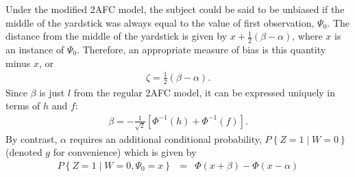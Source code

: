 \documentclass[man]{apa6}
\begin{document}
Under the modified 2AFC model, the subject could be said to be unbiased if the middle of the yardstick was always equal to the value of first observation, $\Psi_0$. The distance from the middle of the yardstick is given by $x + \frac{1}{2}\left(\beta-\alpha\right)$, where $x$ is an instance of $\Psi_0$. Therefore, an appropriate measure of bias is this quantity minus $x$, or
\begin{eqnarray*}
\zeta=\frac{1}{2}\left(\beta-\alpha\right)\textrm{.}
\end{eqnarray*}
Since $\beta$ is just $l$ from the regular 2AFC model, it can be expressed uniquely in terms of $h$ and $f$:
\begin{eqnarray*}
\beta=-\frac{1}{\sqrt{2}}\left[\Phi^{-1}\left(h\right)+\Phi^{-1}\left(f\right)\right]\textrm{.}
\end{eqnarray*}
By contrast, $\alpha$ requires an additional conditional probability, $P\left\{Z=1\mid{}W=0\right\}$ (denoted $g$ for convenience) which is given by
\begin{eqnarray*}
P\left\{Z=1\mid{}W=0,\Psi_0=x\right\}&=&\Phi\left(x+\beta\right)-\Phi\left(x-\alpha\right)\\
\end{eqnarray*}










\end{document}
